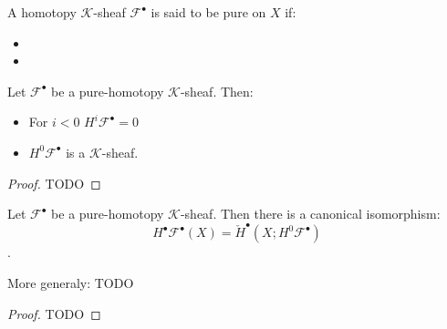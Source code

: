 

\begin{definition}\label{def:pure_homotopy_k_sheaf}
    A homotopy $\mathcal{K}$-sheaf $\mathcal{F}^{\bullet}$ is said to be pure on $X$ if: \begin{itemize}
        \item
        \item
    \end{itemize}
\end{definition}

\begin{lemma}\label{lem:csq_of_pure_homotopy_k_sheaf}
    Let $\mathcal{F}^{\bullet}$ be a pure-homotopy $\mathcal{K}$-sheaf. Then: \begin{itemize}
        \item For $i<0$ $H^i\mathcal{F}^{\bullet}=0$
        \item $H^0\mathcal{F}^{\bullet}$ is a $\mathcal{K}$-sheaf.
    \end{itemize}
\end{lemma}

\begin{proof}
    TODO
\end{proof}

\begin{proposition}\label{prop:cech_of_pure_homotopy_k_sheaf}
    Let $\mathcal{F}^{\bullet}$ be a pure-homotopy $\mathcal{K}$-sheaf. Then there is a canonical isomorphism:
    \[H^{\bullet}\mathcal{F}^{\bullet}(X)=\check{H}^{\bullet}(X;H^0\mathcal{F}^{\bullet})\].

    More generaly: TODO
\end{proposition}

\begin{proof}
    TODO
\end{proof}